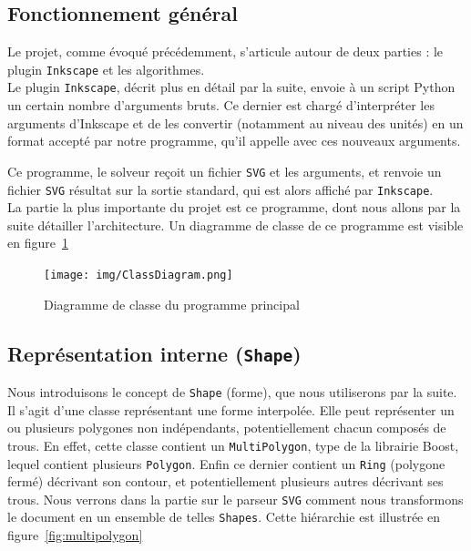 \subsection{Fonctionnement général}
Le projet, comme évoqué précédemment, s'articule autour de deux parties : le plugin \texttt{Inkscape} et les algorithmes.\\

Le plugin \texttt{Inkscape}, décrit plus en détail par la suite, envoie à un script Python un certain nombre d'arguments bruts. Ce dernier est chargé d'interpréter les arguments d'Inkscape et de les convertir (notamment au niveau des unités) en un format accepté par notre programme, qu'il appelle avec ces nouveaux arguments.

Ce programme, le solveur reçoit un fichier \texttt{SVG} et les arguments, et renvoie un fichier  \texttt{SVG} résultat sur la sortie standard, qui est alors affiché par \texttt{Inkscape}.\\

La partie la plus importante du projet est ce programme, dont nous allons par la suite détailler l'architecture. Un diagramme de classe de ce programme est visible en figure~\ref{fig:diagramme}

\begin{figure}[!htb]
\centering
\texttt{[image: img/ClassDiagram.png]}
\caption{Diagramme de classe du programme principal}
\label{fig:diagramme}
\end{figure}

\subsection{Représentation interne (\texttt{Shape})}

Nous introduisons le concept de \texttt{Shape} (forme), que nous utiliserons par la suite. Il s'agit d'une classe représentant une forme interpolée. Elle peut représenter un ou plusieurs polygones non indépendants, potentiellement chacun composés de trous. En effet, cette classe contient un \texttt{MultiPolygon}, type de la librairie Boost, lequel contient plusieurs \texttt{Polygon}. Enfin ce dernier contient un \texttt{Ring} (polygone fermé) décrivant son contour, et potentiellement plusieurs autres décrivant ses trous. Nous verrons dans la partie sur le parseur \texttt{SVG} comment nous transformons le document en un ensemble de telles \texttt{Shapes}. Cette hiérarchie est illustrée en figure~\ref{fig:multipolygon}\\

